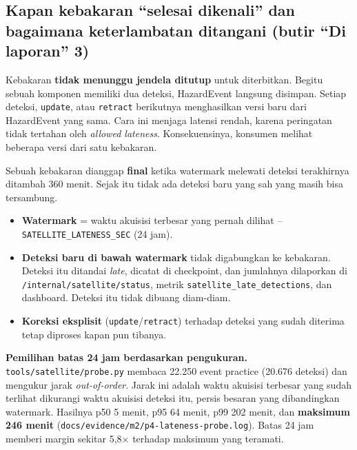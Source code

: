 \subsection{Kapan kebakaran ``selesai dikenali'' dan bagaimana keterlambatan ditangani (butir ``Di laporan'' 3)}

Kebakaran \textbf{tidak menunggu jendela ditutup} untuk diterbitkan. Begitu sebuah komponen memiliki dua deteksi, HazardEvent langsung disimpan. Setiap deteksi, \texttt{update}, atau \texttt{retract} berikutnya menghasilkan versi baru dari HazardEvent yang sama. Cara ini menjaga latensi rendah, karena peringatan tidak tertahan oleh \emph{allowed lateness}. Konsekuensinya, konsumen melihat beberapa versi dari satu kebakaran.


Sebuah kebakaran dianggap \textbf{final} ketika watermark melewati deteksi terakhirnya ditambah 360 menit. Sejak itu tidak ada deteksi baru yang sah yang masih bisa tersambung.


\begin{itemize}
\item \textbf{Watermark} = waktu akuisisi terbesar yang pernah dilihat -- \texttt{SATELLITE\_\allowbreak{}LATENESS\_\allowbreak{}SEC} (24 jam).
\item \textbf{Deteksi baru di bawah watermark} tidak digabungkan ke kebakaran. Deteksi itu ditandai \emph{late}, dicatat di checkpoint, dan jumlahnya dilaporkan di \texttt{/\allowbreak{}internal/\allowbreak{}satellite/\allowbreak{}status}, metrik \texttt{satellite\_\allowbreak{}late\_\allowbreak{}detections}, dan dashboard. Deteksi itu tidak dibuang diam-diam.
\item \textbf{Koreksi eksplisit} (\texttt{update}/\texttt{retract}) terhadap deteksi yang sudah diterima tetap diproses kapan pun tibanya.
\end{itemize}

\textbf{Pemilihan batas 24 jam berdasarkan pengukuran.} \texttt{tools/\allowbreak{}satellite/\allowbreak{}probe.\allowbreak{}py} membaca 22.250 event practice (20.676 deteksi) dan mengukur jarak \emph{out-of-order}. Jarak ini adalah waktu akuisisi terbesar yang sudah terlihat dikurangi waktu akuisisi deteksi itu, persis besaran yang dibandingkan watermark. Hasilnya p50 5 menit, p95 64 menit, p99 202 menit, dan \textbf{maksimum 246 menit} (\texttt{docs/\allowbreak{}evidence/\allowbreak{}m2/\allowbreak{}p4-\allowbreak{}lateness-\allowbreak{}probe.\allowbreak{}log}). Batas 24 jam memberi margin sekitar 5,8$\times$ terhadap maksimum yang teramati.


